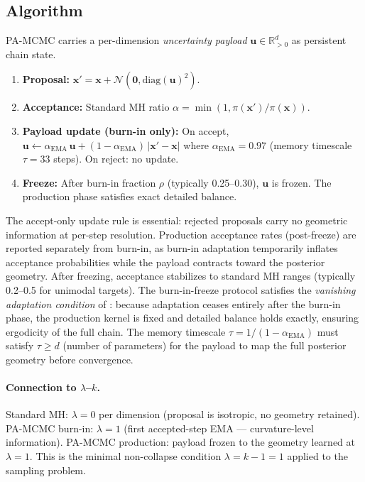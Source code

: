 \documentclass[11pt]{article}
\theoremstyle{definition}
\begin{document}
\subsection{Algorithm}

PA-MCMC carries a per-dimension \emph{uncertainty payload} $\mathbf{u} \in
\mathbb{R}_{>0}^d$ as persistent chain state.

\begin{enumerate}[leftmargin=*]
\item \textbf{Proposal:} $\mathbf{x}' = \mathbf{x} + \mathcal{N}(\mathbf{0}, \mathrm{diag}(\mathbf{u})^2)$.
\item \textbf{Acceptance:} Standard MH ratio $\alpha = \min(1, \pi(\mathbf{x}')/\pi(\mathbf{x}))$.
\item \textbf{Payload update (burn-in only):} On accept,
  $\mathbf{u} \leftarrow \alpha_{\mathrm{EMA}}\,\mathbf{u} + (1-\alpha_{\mathrm{EMA}})\,|\mathbf{x}'-\mathbf{x}|$
  where $\alpha_{\mathrm{EMA}} = 0.97$ (memory timescale $\tau = 33$ steps).
  On reject: no update.
\item \textbf{Freeze:} After burn-in fraction $\rho$ (typically 0.25--0.30), $\mathbf{u}$ is frozen.
  The production phase satisfies exact detailed balance.
\end{enumerate}

The accept-only update rule is essential: rejected proposals carry no geometric
information at per-step resolution.
Production acceptance rates (post-freeze) are reported separately from burn-in,
as burn-in adaptation temporarily inflates acceptance probabilities while the
payload contracts toward the posterior geometry.
After freezing, acceptance stabilizes to standard MH ranges (typically 0.2--0.5
for unimodal targets).
The burn-in-freeze protocol satisfies the \emph{vanishing adaptation condition}
of \citet{roberts2009examples}: because adaptation ceases entirely after the
burn-in phase, the production kernel is fixed and detailed balance holds exactly,
ensuring ergodicity of the full chain.
The memory timescale $\tau = 1/(1-\alpha_{\mathrm{EMA}})$ must satisfy
$\tau \ge d$ (number of parameters) for the payload to map the full posterior
geometry before convergence.

\paragraph{Connection to $\lambda$--$k$.}
Standard MH: $\lambda = 0$ per dimension (proposal is isotropic, no geometry retained).
PA-MCMC burn-in: $\lambda = 1$ (first accepted-step EMA — curvature-level information).
PA-MCMC production: payload frozen to the geometry learned at $\lambda = 1$.
This is the minimal non-collapse condition $\lambda = k-1 = 1$ applied to the
sampling problem.
\end{document}
